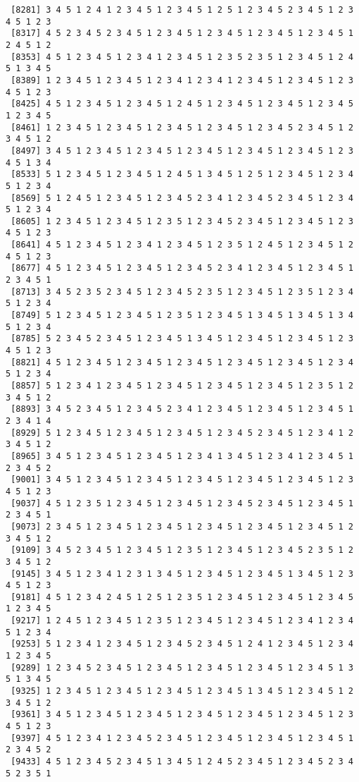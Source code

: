 \documentclass[
  11pt,
]{book}
\begin{document}
\begin{verbatim}
 [8281] 3 4 5 1 2 4 1 2 3 4 5 1 2 3 4 5 1 2 5 1 2 3 4 5 2 3 4 5 1 2 3 4 5 1 2 3
 [8317] 4 5 2 3 4 5 2 3 4 5 1 2 3 4 5 1 2 3 4 5 1 2 3 4 5 1 2 3 4 5 1 2 4 5 1 2
 [8353] 4 5 1 2 3 4 5 1 2 3 4 1 2 3 4 5 1 2 3 5 2 3 5 1 2 3 4 5 1 2 4 5 1 3 4 5
 [8389] 1 2 3 4 5 1 2 3 4 5 1 2 3 4 1 2 3 4 1 2 3 4 5 1 2 3 4 5 1 2 3 4 5 1 2 3
 [8425] 4 5 1 2 3 4 5 1 2 3 4 5 1 2 4 5 1 2 3 4 5 1 2 3 4 5 1 2 3 4 5 1 2 3 4 5
 [8461] 1 2 3 4 5 1 2 3 4 5 1 2 3 4 5 1 2 3 4 5 1 2 3 4 5 2 3 4 5 1 2 3 4 5 1 2
 [8497] 3 4 5 1 2 3 4 5 1 2 3 4 5 1 2 3 4 5 1 2 3 4 5 1 2 3 4 5 1 2 3 4 5 1 3 4
 [8533] 5 1 2 3 4 5 1 2 3 4 5 1 2 4 5 1 3 4 5 1 2 5 1 2 3 4 5 1 2 3 4 5 1 2 3 4
 [8569] 5 1 2 4 5 1 2 3 4 5 1 2 3 4 5 2 3 4 1 2 3 4 5 2 3 4 5 1 2 3 4 5 1 2 3 4
 [8605] 1 2 3 4 5 1 2 3 4 5 1 2 3 5 1 2 3 4 5 2 3 4 5 1 2 3 4 5 1 2 3 4 5 1 2 3
 [8641] 4 5 1 2 3 4 5 1 2 3 4 1 2 3 4 5 1 2 3 5 1 2 4 5 1 2 3 4 5 1 2 4 5 1 2 3
 [8677] 4 5 1 2 3 4 5 1 2 3 4 5 1 2 3 4 5 2 3 4 1 2 3 4 5 1 2 3 4 5 1 2 3 4 5 1
 [8713] 3 4 5 2 3 5 2 3 4 5 1 2 3 4 5 2 3 5 1 2 3 4 5 1 2 3 5 1 2 3 4 5 1 2 3 4
 [8749] 5 1 2 3 4 5 1 2 3 4 5 1 2 3 5 1 2 3 4 5 1 3 4 5 1 3 4 5 1 3 4 5 1 2 3 4
 [8785] 5 2 3 4 5 2 3 4 5 1 2 3 4 5 1 3 4 5 1 2 3 4 5 1 2 3 4 5 1 2 3 4 5 1 2 3
 [8821] 4 5 1 2 3 4 5 1 2 3 4 5 1 2 3 4 5 1 2 3 4 5 1 2 3 4 5 1 2 3 4 5 1 2 3 4
 [8857] 5 1 2 3 4 1 2 3 4 5 1 2 3 4 5 1 2 3 4 5 1 2 3 4 5 1 2 3 5 1 2 3 4 5 1 2
 [8893] 3 4 5 2 3 4 5 1 2 3 4 5 2 3 4 1 2 3 4 5 1 2 3 4 5 1 2 3 4 5 1 2 3 4 1 4
 [8929] 5 1 2 3 4 5 1 2 3 4 5 1 2 3 4 5 1 2 3 4 5 2 3 4 5 1 2 3 4 1 2 3 4 5 1 2
 [8965] 3 4 5 1 2 3 4 5 1 2 3 4 5 1 2 3 4 1 3 4 5 1 2 3 4 1 2 3 4 5 1 2 3 4 5 2
 [9001] 3 4 5 1 2 3 4 5 1 2 3 4 5 1 2 3 4 5 1 2 3 4 5 1 2 3 4 5 1 2 3 4 5 1 2 3
 [9037] 4 5 1 2 3 5 1 2 3 4 5 1 2 3 4 5 1 2 3 4 5 2 3 4 5 1 2 3 4 5 1 2 3 4 5 1
 [9073] 2 3 4 5 1 2 3 4 5 1 2 3 4 5 1 2 3 4 5 1 2 3 4 5 1 2 3 4 5 1 2 3 4 5 1 2
 [9109] 3 4 5 2 3 4 5 1 2 3 4 5 1 2 3 5 1 2 3 4 5 1 2 3 4 5 2 3 5 1 2 3 4 5 1 2
 [9145] 3 4 5 1 2 3 4 1 2 3 1 3 4 5 1 2 3 4 5 1 2 3 4 5 1 3 4 5 1 2 3 4 5 1 2 3
 [9181] 4 5 1 2 3 4 2 4 5 1 2 5 1 2 3 5 1 2 3 4 5 1 2 3 4 5 1 2 3 4 5 1 2 3 4 5
 [9217] 1 2 4 5 1 2 3 4 5 1 2 3 5 1 2 3 4 5 1 2 3 4 5 1 2 3 4 1 2 3 4 5 1 2 3 4
 [9253] 5 1 2 3 4 1 2 3 4 5 1 2 3 4 5 2 3 4 5 1 2 4 1 2 3 4 5 1 2 3 4 1 2 3 4 5
 [9289] 1 2 3 4 5 2 3 4 5 1 2 3 4 5 1 2 3 4 5 1 2 3 4 5 1 2 3 4 5 1 3 5 1 3 4 5
 [9325] 1 2 3 4 5 1 2 3 4 5 1 2 3 4 5 1 2 3 4 5 1 3 4 5 1 2 3 4 5 1 2 3 4 5 1 2
 [9361] 3 4 5 1 2 3 4 5 1 2 3 4 5 1 2 3 4 5 1 2 3 4 5 1 2 3 4 5 1 2 3 4 5 1 2 3
 [9397] 4 5 1 2 3 4 1 2 3 4 5 2 3 4 5 1 2 3 4 5 1 2 3 4 5 1 2 3 4 5 1 2 3 4 5 2
 [9433] 4 5 1 2 3 4 5 2 3 4 5 1 3 4 5 1 2 4 5 2 3 4 5 1 2 3 4 5 2 3 4 5 2 3 5 1

\end{verbatim}
\end{document}
